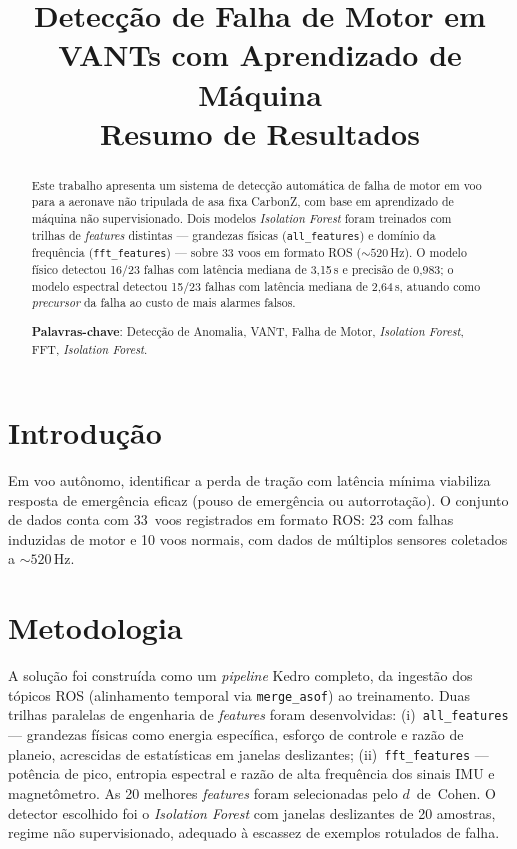 \documentclass[12pt, a4paper]{article}
\begin{document}
\title{\textbf{Detecção de Falha de Motor em VANTs com Aprendizado de Máquina}\\[4pt]
       \large Resumo de Resultados}
\author{}
\date{}
\maketitle
\thispagestyle{empty}
\vspace{-10pt}

\begin{abstract}
\noindent
Este trabalho apresenta um sistema de detecção automática de falha de motor em voo para a aeronave não tripulada de asa fixa CarbonZ, com base em aprendizado de máquina não supervisionado. Dois modelos \textit{Isolation Forest} foram treinados com trilhas de \textit{features} distintas --- grandezas físicas (\texttt{all\_features}) e domínio da frequência (\texttt{fft\_features}) --- sobre 33 voos em formato ROS (${\sim}520$\,Hz). O modelo físico detectou 16/23 falhas com latência mediana de 3,15\,s e precisão de 0,983; o modelo espectral detectou 15/23 falhas com latência mediana de 2,64\,s, atuando como \textit{precursor} da falha ao custo de mais alarmes falsos.

\smallskip
\noindent\textbf{Palavras-chave}: Detecção de Anomalia, VANT, Falha de Motor, \textit{Isolation Forest}, FFT, \textit{Isolation Forest}.
\end{abstract}

\section{Introdução}

Em voo autônomo, identificar a perda de tração com latência mínima viabiliza resposta de emergência eficaz (pouso de emergência ou autorrotação). O conjunto de dados conta com 33~voos registrados em formato ROS: 23 com falhas induzidas de motor e 10 voos normais, com dados de múltiplos sensores coletados a ${\sim}520$\,Hz.

\section{Metodologia}

A solução foi construída como um \textit{pipeline} Kedro completo, da ingestão dos tópicos ROS (alinhamento temporal via \texttt{merge\_asof}) ao treinamento. Duas trilhas paralelas de engenharia de \textit{features} foram desenvolvidas: (i)~\texttt{all\_features} --- grandezas físicas como energia específica, esforço de controle e razão de planeio, acrescidas de estatísticas em janelas deslizantes; (ii)~\texttt{fft\_features} --- potência de pico, entropia espectral e razão de alta frequência dos sinais IMU e magnetômetro. As 20 melhores \textit{features} foram selecionadas pelo $d$~de~Cohen. O detector escolhido foi o \textit{Isolation Forest} com janelas deslizantes de 20 amostras, regime não supervisionado, adequado à escassez de exemplos rotulados de falha.
\end{document}
